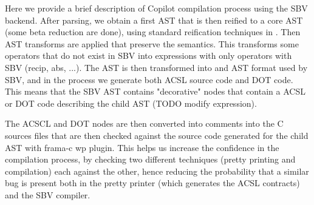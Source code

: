 Here we provide a brief description of Copilot compilation process
using the SBV backend.  After parsing, we obtain a first AST that is
then reified to a core AST (some beta reduction are done), using
standard reification techniques in \cite{Copilot06}. Then  AST
transforms are applied that preserve the semantics. This transforms some
operators  that do not exist in SBV into expressions with only operators
with SBV (recip, abs, ...). The AST is then transformed 
into and AST format used by SBV, and in the process we generate both
ACSL source code and DOT code. This means that the SBV AST contains
"decorative" nodes that contain a ACSL or DOT code describing the
child AST (TODO modify expression).

The ACSCL and DOT  nodes are then converted into comments into the C
sources files that are then checked against the source code generated
for the child AST with frama-c wp plugin. This helps us increase the
confidence in the compilation process, by checking two different
techniques (pretty printing and compilation) each against the other,
hence reducing the probability that a similar bug is present both in
the pretty printer (which generates the ACSL contracts) and the SBV
compiler.





